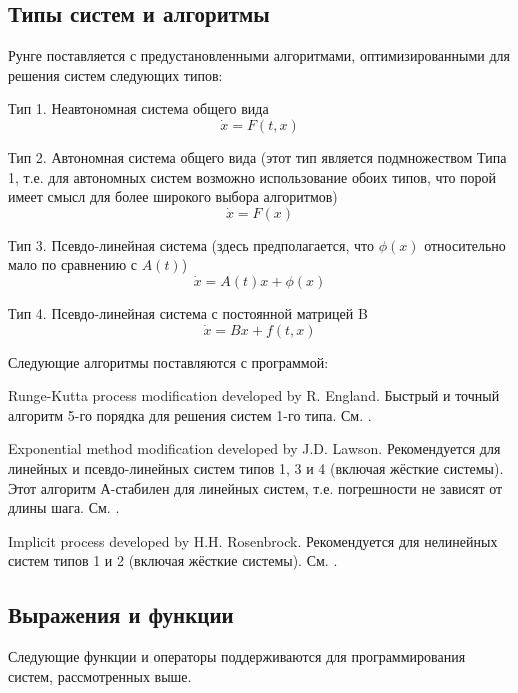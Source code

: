 \documentclass[12pt]{article}
\begin{document}
\subsection{Типы систем и алгоритмы}
Рунге поставляется с предустановленными алгоритмами, оптимизированными для решения систем следующих типов:
\begin{compactitem}
\item Тип 1. Неавтономная система общего вида
\[
\dot x=F(t,x)
\]
\item Тип 2. Автономная система общего вида (этот тип является подмножеством Типа 1,
т.е. для автономных систем возможно использование обоих типов, что порой имеет смысл
для более широкого выбора алгоритмов)
\[
\dot x=F(x)
\]
\item Тип 3. Псевдо-линейная система 
(здесь предполагается, что \(\phi(x)\) относительно мало по сравнению с \(A(t)\))
\[
\dot x=A(t)x+\phi(x)
\]
\item Тип 4. Псевдо-линейная система с постоянной матрицей B
\[
\dot x=Bx+f(t,x)
\]
\end{compactitem}
Следующие алгоритмы поставляются с программой:
\begin{compactitem}
\item Runge-Kutta process modification developed by R. England. 
Быстрый и точный алгоритм 5-го порядка для решения систем 1-го типа.
См. \cite{England}.
\item Exponential method modification developed by J.D. Lawson. 
Рекомендуется для линейных и псевдо-линейных систем типов 1, 3 и 4 
(включая жёсткие системы).
Этот алгоритм А-стабилен для линейных систем, 
т.е. погрешности не зависят от длины шага.
См. \cite{Lawson}.
\item Implicit process developed by H.H. Rosenbrock. 
Рекомендуется для нелинейных систем типов 1 и 2 (включая жёсткие системы).
См. \cite{Rosenbrock}.
\end{compactitem}

\subsection{Выражения и функции}

\EndLink
Следующие функции и операторы поддерживаются для программирования систем, рассмотренных выше.
\end{document}
